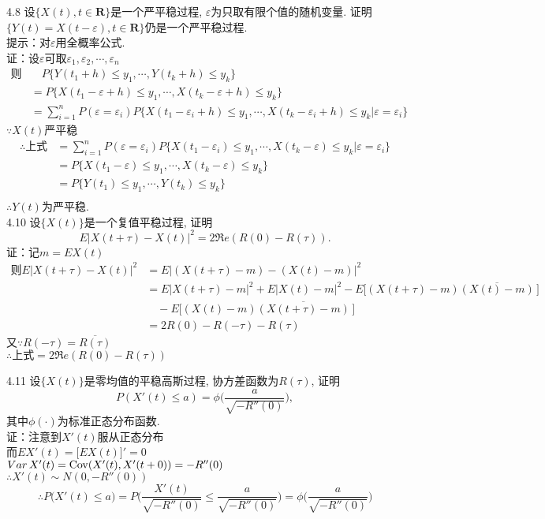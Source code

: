 4.8 设$\{X(t), t\in \mathbf R\}$是一个严平稳过程, $\varepsilon$为只取有限个值的随机变量. 证明$\{Y(t) = X(t-\varepsilon), t\in \mathbf R\}$仍是一个严平稳过程.\\
提示：对$\varepsilon$用全概率公式.\\
证：设$\varepsilon$可取$\varepsilon_1, \varepsilon_2, \cdots, \varepsilon_n$\\
\[
\begin{split}
\text{则}& \quad P\big\{Y(t_1+h) \leqslant y_1, \cdots, Y(t_k+h) \leqslant y_k\big\}\\
	& = P\big\{X(t_1-\varepsilon+h) \leqslant y_1, \cdots, X(t_k-\varepsilon+h) \leqslant y_k\big\}\\
	& = \sum^n_{i=1}P(\varepsilon = \varepsilon_i)P\big\{X(t_1-\varepsilon_i + h) \leqslant y_1, \cdots, X(t_k-\varepsilon_i + h) \leqslant y_k | \varepsilon = \varepsilon_i\big\}
\end{split}
\]
$\because X(t)$严平稳\\
\[
\begin{split}
\therefore \text{上式} & = \sum^n_{i=1}P(\varepsilon = \varepsilon_i)P\big\{X(t_1-\varepsilon_i) \leqslant y_1, \cdots, X(t_k-\varepsilon) \leqslant y_k | \varepsilon = \varepsilon_i\big\}\\
					& = P\big\{X(t_1-\varepsilon) \leqslant y_1, \cdots, X(t_k-\varepsilon) \leqslant y_k\big\}\\
					& = P\big\{Y(t_1) \leqslant y_1, \cdots, Y(t_k) \leqslant y_k\big\}\\
\end{split}
\]
$\therefore Y(t)$为严平稳.\\


4.10 设$\{X(t)\}$是一个复值平稳过程, 证明
	\[
	E|X(t+\tau)-X(t)|^2 = 2\Re e(R(0)-R(\tau)).
	\]
证：记$m=EX(t)$\\
\[
\begin{split}
\text{则} E\big|X(t+\tau) - X(t)\big|^2 & = E\big|(X(t+\tau)-m)-(X(t)-m)\big|^2\\
								& = E\big|X(t+\tau)-m\big|^2 + E\big|X(t)-m\big|^2 - E\Big[(X(t+\tau)-m)\overline{(X(t)-m)}\,\Big] \\
								& \quad - E\Big[(X(t)-m)\overline{(X(t+\tau)-m)}\,\Big]\\
								& = 2R(0)-R(-\tau)-R(\tau)
\end{split}
\]
又$\because R(-\tau) = \overline{R(\tau)}$\\
$\therefore \text{上式} = 2\Re e(R(0)-R(\tau))$


4.11 设$\{X(t)\}$是零均值的平稳高斯过程, 协方差函数为$R(\tau)$, 证明
\[
P(X'(t) \leqslant a) = \phi\Bigg(\frac{a}{\sqrt{-R''(0)}}\Bigg),
\]
其中$\phi(\cdot)$为标准正态分布函数.\\
证：注意到$X'(t)$服从正态分布\\
	而$EX'(t) = \big[EX(t)\big]' = 0$\\
	$Var\,X'(t) = \mathrm{Cov}(X'(t), X'(t+0)) = -R''(0)$\\
	$\therefore X'(t) \sim N(0,-R''(0))$\\
	\[
	\therefore P\big(X'(t) \leqslant a\big) = P\Bigg(\frac{X'(t)}{\sqrt{-R''(0)}} \leqslant \frac{a}{\sqrt{-R''(0)}}\Bigg) = \phi\Bigg(\frac{a}{\sqrt{-R''(0)}}\Bigg)
	\]


